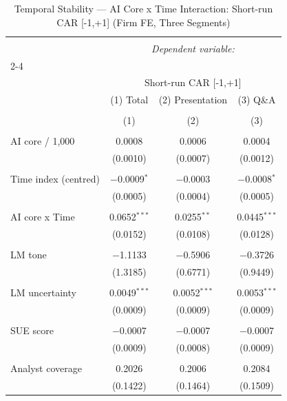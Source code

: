 
\begin{table}[!htbp] \centering 
  \caption{Temporal Stability — AI Core x Time Interaction: Short-run CAR [-1,+1] (Firm FE, Three Segments)} 
  \label{} 
\begin{tabular}{@{\extracolsep{5pt}}lccc} 
\\[-1.8ex]\hline 
\hline \\[-1.8ex] 
 & \multicolumn{3}{c}{\textit{Dependent variable:}} \\ 
\cline{2-4} 
\\[-1.8ex] & \multicolumn{3}{c}{Short-run CAR [-1,+1]} \\ 
 & (1) Total & (2) Presentation & (3) Q\&A \\ 
\\[-1.8ex] & (1) & (2) & (3)\\ 
\hline \\[-1.8ex] 
 AI core / 1,000 & 0.0008 & 0.0006 & 0.0004 \\ 
  & (0.0010) & (0.0007) & (0.0012) \\ 
  & & & \\ 
 Time index (centred) & $-$0.0009$^{*}$ & $-$0.0003 & $-$0.0008$^{*}$ \\ 
  & (0.0005) & (0.0004) & (0.0005) \\ 
  & & & \\ 
 AI core x Time & 0.0652$^{***}$ & 0.0255$^{**}$ & 0.0445$^{***}$ \\ 
  & (0.0152) & (0.0108) & (0.0128) \\ 
  & & & \\ 
 LM tone & $-$1.1133 & $-$0.5906 & $-$0.3726 \\ 
  & (1.3185) & (0.6771) & (0.9449) \\ 
  & & & \\ 
 LM uncertainty & 0.0049$^{***}$ & 0.0052$^{***}$ & 0.0053$^{***}$ \\ 
  & (0.0009) & (0.0009) & (0.0009) \\ 
  & & & \\ 
 SUE score & $-$0.0007 & $-$0.0007 & $-$0.0007 \\ 
  & (0.0009) & (0.0008) & (0.0009) \\ 
  & & & \\ 
 Analyst coverage & 0.2026 & 0.2006 & 0.2084 \\ 
  & (0.1422) & (0.1464) & (0.1509) \\ 

\end{tabular}
\end{table}
